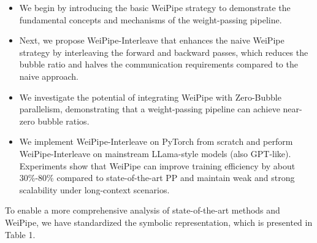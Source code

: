 \documentclass[sigplan,review]{acmart}
\begin{document}
\begin{itemize}
    \item We begin by introducing the basic WeiPipe strategy to demonstrate the fundamental concepts and mechanisms of the weight-passing pipeline.
    \item Next, we propose WeiPipe-Interleave that enhances the naive WeiPipe strategy by interleaving the forward and backward passes, which reduces the bubble ratio and halves the communication requirements compared to the naive approach.
    \item We investigate the potential of integrating WeiPipe with Zero-Bubble parallelism, demonstrating that a weight-passing pipeline can achieve near-zero bubble ratios.
    \item We implement WeiPipe-Interleave on PyTorch from scratch and perform WeiPipe-Interleave on mainstream LLama-style\cite{touvron2023llama2openfoundation} models (also GPT-like). Experiments show that WeiPipe can improve training efficiency by about 30\%-80\% compared to state-of-the-art PP and maintain weak and strong scalability under long-context scenarios.
\end{itemize}


To enable a more comprehensive analysis of state-of-the-art methods and WeiPipe, we have standardized the symbolic representation, which is presented in Table 1. 
\end{document}

